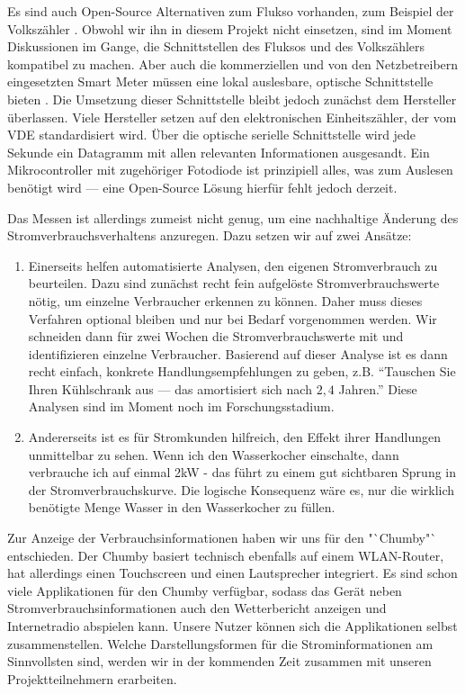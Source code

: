 \documentclass[12pt,BCOR=8.5mm]{scrartcl}
\begin{document}
Es sind auch Open-Source Alternativen zum Flukso vorhanden, zum Beispiel
der Volkszähler . Obwohl wir ihn in diesem Projekt nicht einsetzen, sind
im Moment Diskussionen im Gange, die Schnittstellen des Fluksos und des
Volkszählers kompatibel zu machen. Aber auch die kommerziellen und von
den Netzbetreibern eingesetzten Smart Meter müssen eine lokal
auslesbare, optische Schnittstelle bieten .  Die Umsetzung dieser Schnittstelle bleibt jedoch
zunächst dem Hersteller überlassen. Viele Hersteller setzen auf den
elektronischen Einheitszähler, der vom VDE  standardisiert wird. Über die optische serielle
Schnittstelle wird jede Sekunde ein Datagramm mit allen relevanten
Informationen ausgesandt. Ein Mikrocontroller mit zugehöriger Fotodiode
ist prinzipiell alles, was zum Auslesen benötigt wird --- eine
Open-Source Lösung hierfür fehlt jedoch derzeit.

Das Messen ist allerdings zumeist nicht genug, um eine nachhaltige
Änderung des Stromverbrauchsverhaltens anzuregen. Dazu setzen wir auf
zwei Ansätze:

\begin{enumerate}
  \item Einerseits helfen automatisierte Analysen, den eigenen
    Stromverbrauch zu beurteilen. Dazu sind zunächst recht fein
    aufgelöste Stromverbrauchswerte nötig, um einzelne Verbraucher
    erkennen zu können. Daher muss dieses Verfahren optional bleiben und
    nur bei Bedarf vorgenommen werden. Wir schneiden dann für zwei
    Wochen die Stromverbrauchswerte mit und identifizieren einzelne
    Verbraucher. Basierend auf dieser Analyse ist es dann recht einfach,
    konkrete Handlungsempfehlungen zu geben, z.B. "`Tauschen Sie Ihren
    Kühlschrank aus --- das amortisiert sich nach $2,4$ Jahren."' 
    Diese Analysen sind im Moment noch im Forschungsstadium.
  \item Andererseits ist es für Stromkunden hilfreich, den Effekt ihrer
    Handlungen unmittelbar zu sehen. Wenn ich den Wasserkocher
    einschalte, dann verbrauche ich auf einmal 2kW - das führt zu einem
    gut sichtbaren Sprung in der Stromverbrauchskurve. Die logische
    Konsequenz wäre es, nur die wirklich benötigte Menge Wasser in den
    Wasserkocher zu füllen.
\end{enumerate}

Zur Anzeige der Verbrauchsinformationen haben wir uns für den
"`Chumby"` entschieden. Der Chumby basiert technisch
ebenfalls auf einem WLAN-Router, hat allerdings einen Touchscreen und
einen Lautsprecher integriert. Es sind schon viele Applikationen für den
Chumby verfügbar, sodass das Gerät neben Stromverbrauchsinformationen
auch den Wetterbericht anzeigen und Internetradio abspielen kann. Unsere
Nutzer können sich die Applikationen selbst zusammenstellen. Welche
Darstellungsformen für die Strominformationen am Sinnvollsten sind,
werden wir in der kommenden Zeit zusammen mit unseren Projektteilnehmern
erarbeiten.
\end{document}
